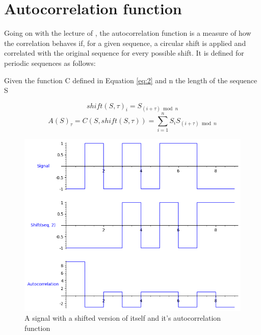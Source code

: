 \section{Autocorrelation function}

Going on with the lecture of \citet{golomb_ref}, the autocorrelation function
is a measure of how the correlation behaves if, for a given sequence, a
circular shift is applied and correlated with the original sequence for every
possible shift. It is defined for periodic sequences as follows:

\begin{definition}[Autocorrelation]\label{def:3}

Given the function C defined in Equation \ref{eq:2} and n the length of the
sequence S

\begin{equation}\label{eq:3}
  shift(S, \tau)_i = S_{(i+\tau) \bmod n}
\end{equation}
\begin{equation}\label{eq:4}
  A(S)_{\tau} = C(S, shift(S, \tau)) = \sum_{i=1}^{n}S_{i}S_{(i+\tau) \bmod n}
\end{equation}

\end{definition}

\begin{figure}[ht!] %
\begin{center}
\includegraphics[width=0.7\linewidth]{Chapters/Introduction/signals_autocorrelation}
\end{center}
\caption{A signal with a shifted version of itself and it's autocorrelation function}
\label{introduction_signals_autocorrelation}
\end{figure}

